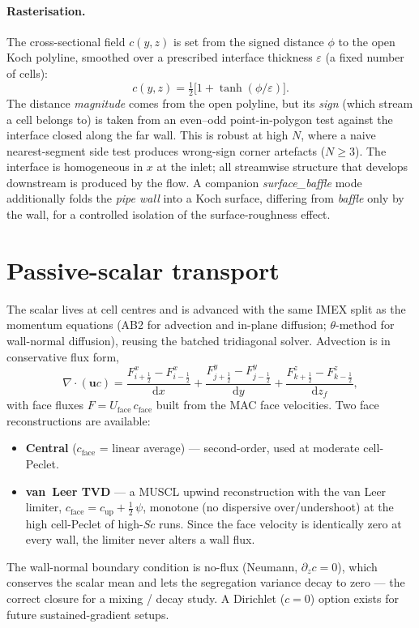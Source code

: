\documentclass[11pt]{article}
\newcommand{\dd}{\mathrm{d}}
\newcommand{\Sc}{\mathit{Sc}}
\newcommand{\uvec}{\bm{u}}
\begin{document}
\paragraph{Rasterisation.} The cross-sectional field $c(y,z)$ is set from
the signed distance $\phi$ to the open Koch polyline, smoothed over a
prescribed interface thickness $\varepsilon$ (a fixed number of cells):
\begin{equation}
  c(y,z) = \tfrac12\bigl[1 + \tanh(\phi/\varepsilon)\bigr].
\end{equation}
The distance \emph{magnitude} comes from the open polyline, but its
\emph{sign} (which stream a cell belongs to) is taken from an even--odd
point-in-polygon test against the interface closed along the far wall.
This is robust at high $N$, where a naive nearest-segment side test
produces wrong-sign corner artefacts ($N \ge 3$). The interface is
homogeneous in $x$ at the inlet; all streamwise structure that develops
downstream is produced by the flow. A companion \emph{surface\_baffle}
mode additionally folds the \emph{pipe wall} into a Koch surface,
differing from \emph{baffle} only by the wall, for a controlled
isolation of the surface-roughness effect.

\section{Passive-scalar transport}

The scalar lives at cell centres and is advanced with the same IMEX
split as the momentum equations (AB2 for advection and in-plane
diffusion; $\theta$-method for wall-normal diffusion), reusing the
batched tridiagonal solver. Advection is in conservative flux form,
\begin{equation}
  \nabla\!\cdot(\uvec c)
   = \frac{F^x_{i+\frac12}-F^x_{i-\frac12}}{\dd x}
   + \frac{F^y_{j+\frac12}-F^y_{j-\frac12}}{\dd y}
   + \frac{F^z_{k+\frac12}-F^z_{k-\frac12}}{\dd z_{f}},
\end{equation}
with face fluxes $F = U_{\mathrm{face}}\,c_{\mathrm{face}}$ built from the
MAC face velocities. Two face reconstructions are available:
\begin{itemize}\itemsep2pt
\item \textbf{Central} ($c_{\mathrm{face}}$ = linear average) ---
  second-order, used at moderate cell-Peclet.
\item \textbf{van~Leer TVD} --- a MUSCL upwind reconstruction with the van
  Leer limiter, $c_{\mathrm{face}} = c_{\mathrm{up}} +
  \tfrac12\,\psi$, monotone (no dispersive over/undershoot) at the high
  cell-Peclet of high-$\Sc$ runs. Since the face velocity is identically
  zero at every wall, the limiter never alters a wall flux.
\end{itemize}
The wall-normal boundary condition is no-flux (Neumann,
$\partial_z c = 0$), which conserves the scalar mean and lets the
segregation variance decay to zero --- the correct closure for a mixing /
decay study. A Dirichlet ($c=0$) option exists for future
sustained-gradient setups.
\end{document}
